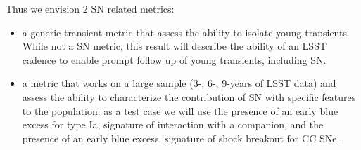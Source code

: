 Thus we envision 2 SN related metrics: 
\begin{itemize}
\item a generic transient metric that assess the ability to isolate young transients. While not a SN metric, this result will describe the ability of an LSST cadence to enable prompt follow up of young transients, including SN. 
\item a metric that works on a large sample (3-, 6-, 9-years of LSST data) and assess the ability to characterize the contribution of SN with specific features to the population: as a test case we will use the presence of an early blue excess for type Ia, signature of interaction with a companion, and the presence of an early blue excess, signature of shock breakout for CC SNe.
\end{itemize}
